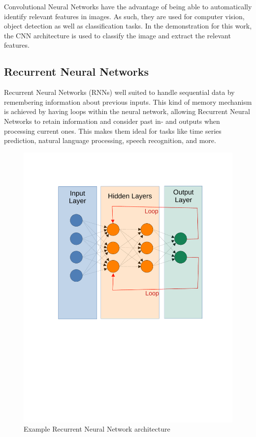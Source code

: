 \documentclass[12pt, a4paper, titlepage]{report}
\begin{document}
Convolutional Neural Networks have the advantage of being able to automatically identify relevant features in images. As such, they are used for computer vision, object detection as well as classification tasks. In the demonstration for this work, the CNN architecture is used to classify the image and extract the relevant features.


\subsection{Recurrent Neural Networks}

Recurrent Neural Networks (RNNs) well suited to handle sequential data by remembering information about previous inputs. This kind of memory mechanism is achieved by having loops within the neural network, allowing Recurrent Neural Networks to retain information and consider past in- and outputs when processing current ones. This makes them ideal for tasks like time series prediction, natural language processing, speech recognition, and more.

\begin{figure}
	\centering
	\includegraphics[width=1.0\textwidth]{../rc/images/rnn_architecture.pdf}
   \caption{Example Recurrent Neural Network architecture \cite{img_rnn_architecture}}
	\label{fig:rnn_architecture}
\end{figure}
\end{document}
